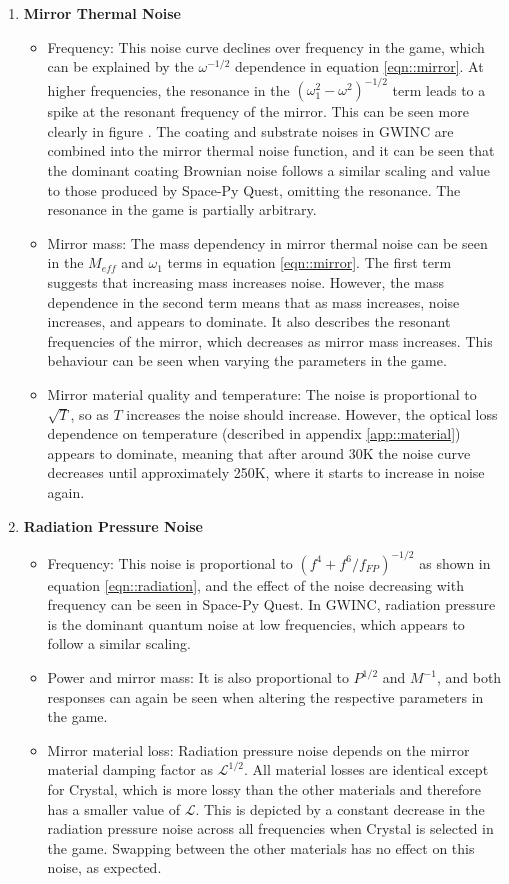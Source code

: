 \documentclass{article}
\begin{document}
\begin{enumerate}
    \item \textbf{Mirror Thermal Noise}
    \begin{itemize}
    \item Frequency: This noise curve declines over frequency in the game, which can be explained by the $\omega^{-1/2}$ dependence in equation \ref{eqn::mirror}. At higher frequencies, the resonance in the $(\omega_1^2-\omega^2)^{-1/2}$ term leads to a spike at the resonant frequency of the mirror. This can be seen more clearly in figure \label{fig::SPQMaxNoLim}. The coating and substrate noises in GWINC are combined into the mirror thermal noise function, and it can be seen that the dominant coating Brownian noise follows a similar scaling and value to those produced by Space-Py Quest, omitting the resonance. The resonance in the game is partially arbitrary. 
    \item Mirror mass: The mass dependency in mirror thermal noise can be seen in the $M_{eff}$ and $\omega_1$ terms in equation \ref{eqn::mirror}. The first term suggests that increasing mass increases noise. However, the mass dependence in the second term  means that as mass increases, noise increases, and appears to dominate. It also describes the resonant frequencies of the mirror, which decreases as mirror mass increases. This behaviour can be seen when varying the parameters in the game.
    \item Mirror material quality and temperature: The noise is proportional to $\sqrt{T}$, so as $T$ increases the noise should increase. However, the optical loss dependence on temperature (described in appendix \ref{app::material}) appears to dominate, meaning that after around 30K the noise curve decreases until approximately 250K, where it starts to increase in noise again. 
	\end{itemize}
    
    \item \textbf{Radiation Pressure Noise}
    \begin{itemize}
    \item Frequency: This noise is proportional to $(f^4+f^6/f_{FP})^{-1/2}$ as shown in equation \ref{eqn::radiation}, and the effect of the noise decreasing with frequency can be seen in Space-Py Quest. In GWINC, radiation pressure is the dominant quantum noise at low frequencies, which appears to follow a similar scaling.  
\item Power and mirror mass: It is also proportional to $P^{1/2}$ and $M^{-1}$, and both responses can again be seen when altering the respective parameters in the game.
\item Mirror material loss: Radiation pressure noise depends on the mirror material damping factor as $\mathcal{L}^{1/2}$. All material losses are identical except for Crystal, which is more lossy than the other materials and therefore has a smaller value of $\mathcal{L}$. This is depicted by a constant decrease in the radiation pressure noise across all frequencies when Crystal is selected in the game. Swapping between the other materials has no effect on this noise, as expected.
\end{itemize}
    

\end{enumerate}
\end{document}
